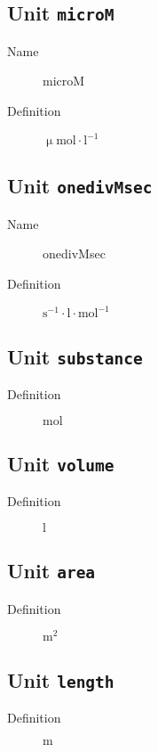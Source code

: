 \documentclass[11pt,twoside,a4paper]{scrartcl}
\begin{document}
\subsection{Unit \texttt{microM}}
\begin{description}
\item[Name] microM
\item[Definition] $\upmu\mathrm{mol}\cdot \mathrm{l}^{-1}$
\end{description}

\subsection{Unit \texttt{onedivMsec}}
\begin{description}
\item[Name] onedivMsec
\item[Definition] $\mathrm{s}^{-1}\cdot \mathrm{l}\cdot \mathrm{mol}^{-1}$
\end{description}

\subsection{Unit \texttt{substance}}
\begin{description}
\item[Definition] $\mathrm{mol}$
\end{description}

\subsection{Unit \texttt{volume}}
\begin{description}
\item[Definition] $\mathrm{l}$
\end{description}

\subsection{Unit \texttt{area}}
\begin{description}
\item[Definition] $\mathrm{m}^{2}$
\end{description}

\subsection{Unit \texttt{length}}
\begin{description}
\item[Definition] $\mathrm{m}$
\end{description}
\end{document}
